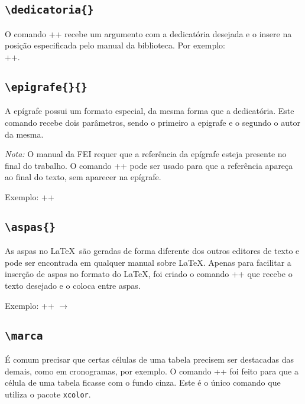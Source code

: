 \documentclass[xindy,rascunho]{fei}
\begin{document}
\begin{teorema}
    \subsection{\texttt{\textbackslash dedicatoria\{\}}}
    O comando \latexinline+\dedicatoria{}+ recebe um argumento com a dedicatória desejada e o insere na posição especificada pelo manual da biblioteca. Por exemplo: \\ \latexinline++.
    
    \subsection{\texttt{\textbackslash epigrafe\{\}\{\}}}
    A epígrafe possui um formato especial, da mesma forma que a dedicatória. Este comando recebe dois parâmetros, sendo o primeiro a epigrafe e o segundo o autor da mesma.
    
    \emph{Nota:} O manual da FEI requer que a referência da epígrafe esteja presente no final do trabalho. O comando \latexinline+\nocite{obra}+ pode ser usado para que a referência apareça ao final do texto, sem aparecer na epígrafe.
    
    Exemplo: \latexinline++
    
    \subsection{\texttt{\textbackslash aspas\{\}}}
    As aspas no \LaTeX\ são geradas de forma diferente dos outros editores de texto e pode ser encontrada em qualquer manual sobre \LaTeX. Apenas para facilitar a inserção de aspas no formato do \LaTeX, foi criado o comando \latexinline+\aspas{}+ que recebe o texto desejado e o coloca entre aspas.

    Exemplo: \latexinline++ $\to$ 
    
    \subsection{\texttt{\textbackslash marca}}
    É comum precisar que certas células de uma tabela precisem ser destacadas das demais, como em cronogramas, por exemplo. O comando \latexinline+\marca+ foi feito para que a célula de uma tabela ficasse com o fundo cinza. Este é o único comando que utiliza o pacote \texttt{xcolor}.


\end{teorema}
\end{document}
